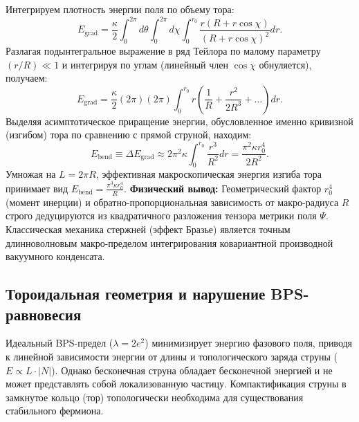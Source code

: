 \documentclass[11pt,a4paper]{article}
\begin{document}
Интегрируем плотность энергии поля по объему тора:
\begin{equation}
E_{\text{grad}} = \frac{\kappa}{2} \int_0^{2\pi} d\theta \int_0^{2\pi} d\chi \int_0^{r_0} \frac{r(R + r\cos\chi)}{(R + r\cos\chi)^2} dr.
\end{equation}
Разлагая подынтегральное выражение в ряд Тейлора по малому параметру $(r/R) \ll 1$ и интегрируя по углам (линейный член $\cos\chi$ обнуляется), получаем:
\begin{equation}
E_{\text{grad}} = \frac{\kappa}{2} (2\pi) (2\pi) \int_0^{r_0} r \left( \frac{1}{R} + \frac{r^2}{2R^3} + \dots \right) dr.
\end{equation}
Выделяя асимптотическое приращение энергии, обусловленное именно кривизной (изгибом) тора по сравнению с прямой струной, находим:
\begin{equation}
E_{\text{bend}} \equiv \Delta E_{\text{grad}} \approx 2\pi^2 \kappa \int_0^{r_0} \frac{r^3}{R^2} dr = \frac{\pi^2 \kappa r_0^4}{2 R^2}.
\label{eq:field_to_mechanics}
\end{equation}
Умножая на $L = 2\pi R$, эффективная макроскопическая энергия изгиба тора принимает вид $E_{\text{bend}} = \frac{\pi^3 \kappa r_0^4}{R}$.
\textbf{Физический вывод:} Геометрический фактор $r_0^4$ (момент инерции) и обратно-пропорциональная зависимость от макро-радиуса $R$ строго дедуцируются из квадратичного разложения тензора метрики поля $\Psi$. Классическая механика стержней (эффект Бразье) является точным длинноволновым макро-пределом интегрирования ковариантной производной вакуумного конденсата.
	
\subsection{Тороидальная геометрия и нарушение BPS-равновесия}
Идеальный BPS-предел ($\lambda = 2e^2$) минимизирует энергию фазового поля, приводя к линейной зависимости энергии от длины и топологического заряда струны ($E \propto L \cdot |N|$). Однако бесконечная струна обладает бесконечной энергией и не может представлять собой локализованную частицу. Компактификация струны в замкнутое кольцо (тор) топологически необходима для существования стабильного фермиона.
	
\end{document}
